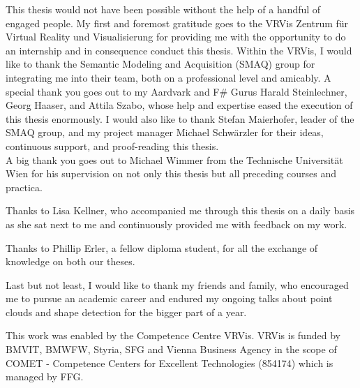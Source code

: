 \documentclass[draft,final]{vutinfth} %
\begin{document}
\frontmatter %

\addstatementpage


\begin{acknowledgements*}

This thesis would not have been possible without the help of a handful of engaged people. 
My first and foremost gratitude goes to the VRVis Zentrum für Virtual Reality und Visualisierung for providing me with the opportunity to do an internship and in consequence conduct this thesis. Within the VRVis, I would like to thank the Semantic Modeling and Acquisition (SMAQ) group for integrating me into their team, both on a professional level and amicably. A special thank you goes out to my Aardvark and F\# Gurus Harald Steinlechner, Georg Haaser, and Attila Szabo, whose help and expertise eased the execution of this thesis enormously. 
I would also like to thank Stefan Maierhofer, leader of the SMAQ group, and my project manager Michael Schwärzler for their ideas, continuous support, and proof-reading this thesis. 
\\
A big thank you goes out to Michael Wimmer from the Technische Universität Wien for his supervision on not only this thesis but all preceding courses and practica. 

Thanks to Lisa Kellner, who accompanied me through this thesis on a daily basis as she sat next to me and continuously provided me with feedback on my work. 

Thanks to Phillip Erler, a fellow diploma student, for all the exchange of knowledge on both our theses. 

Last but not least, I would like to thank my friends and family, who encouraged me to pursue an academic career and endured my ongoing talks about point clouds and shape detection for the bigger part of a year.

This work was enabled by the Competence Centre VRVis. VRVis is funded by BMVIT, BMWFW, Styria, SFG and Vienna Business Agency in the scope of COMET - Competence Centers for Excellent Technologies (854174) which is managed by FFG.

\end{acknowledgements*}
\end{document}
